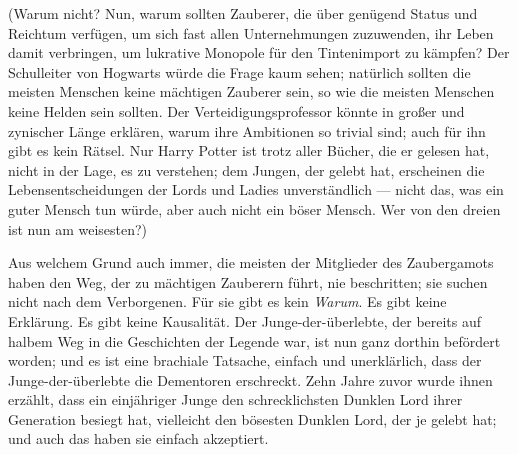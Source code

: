 (Warum nicht? Nun, warum sollten Zauberer, die über genügend Status und Reichtum verfügen, um sich fast allen Unternehmungen zuzuwenden, ihr Leben damit verbringen, um lukrative Monopole für den Tintenimport zu kämpfen? Der Schulleiter von Hogwarts würde die Frage kaum sehen; natürlich sollten die meisten Menschen keine mächtigen Zauberer sein, so wie die meisten Menschen keine Helden sein sollten. Der Verteidigungsprofessor könnte in großer und zynischer Länge erklären, warum ihre Ambitionen so trivial sind; auch für ihn gibt es kein Rätsel. Nur Harry Potter ist trotz aller Bücher, die er gelesen hat, nicht in der Lage, es zu verstehen; dem Jungen, der gelebt hat, erscheinen die Lebensentscheidungen der Lords und Ladies unverständlich — nicht das, was ein guter Mensch tun würde, aber auch nicht ein böser Mensch. Wer von den dreien ist nun am weisesten?)

Aus welchem Grund auch immer, die meisten der Mitglieder des Zaubergamots haben den Weg, der zu mächtigen Zauberern führt, nie beschritten; sie suchen nicht nach dem Verborgenen. Für sie gibt es kein \emph{Warum}. Es gibt keine Erklärung. Es gibt keine Kausalität. Der Junge-der-überlebte, der bereits auf halbem Weg in die Geschichten der Legende war, ist nun ganz dorthin befördert worden; und es ist eine brachiale Tatsache, einfach und unerklärlich, dass der Junge-der-überlebte die Dementoren erschreckt. Zehn Jahre zuvor wurde ihnen erzählt, dass ein einjähriger Junge den schrecklichsten Dunklen Lord ihrer Generation besiegt hat, vielleicht den bösesten Dunklen Lord, der je gelebt hat; und auch das haben sie einfach akzeptiert.

